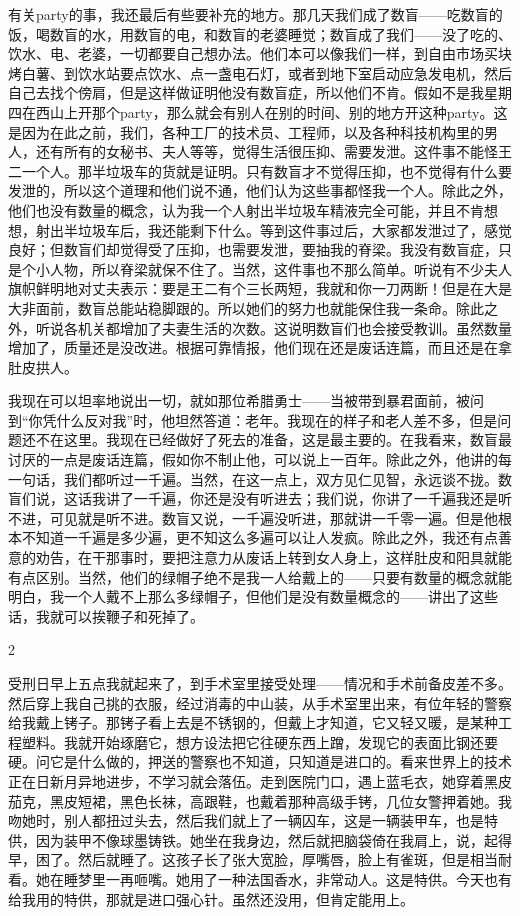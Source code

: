 有关party的事，我还最后有些要补充的地方。那几天我们成了数盲——吃数盲的饭，喝数盲的水，用数盲的电，和数盲的老婆睡觉；数盲成了我们——没了吃的、饮水、电、老婆，一切都要自己想办法。他们本可以像我们一样，到自由市场买块烤白薯、到饮水站要点饮水、点一盏电石灯，或者到地下室启动应急发电机，然后自己去找个傍肩，但是这样做证明他没有数盲症，所以他们不肯。假如不是我星期四在西山上开那个party，那么就会有别人在别的时间、别的地方开这种party。这是因为在此之前，我们，各种工厂的技术员、工程师，以及各种科技机构里的男人，还有所有的女秘书、夫人等等，觉得生活很压抑、需要发泄。这件事不能怪王二一个人。那半垃圾车的货就是证明。只有数盲才不觉得压抑，也不觉得有什么要发泄的，所以这个道理和他们说不通，他们认为这些事都怪我一个人。除此之外，他们也没有数量的概念，认为我一个人射出半垃圾车精液完全可能，并且不肯想想，射出半垃圾车后，我还能剩下什么。等到这件事过后，大家都发泄过了，感觉良好；但数盲们却觉得受了压抑，也需要发泄，要抽我的脊梁。我没有数盲症，只是个小人物，所以脊梁就保不住了。当然，这件事也不那么简单。听说有不少夫人旗帜鲜明地对丈夫表示：要是王二有个三长两短，我就和你一刀两断！但是在大是大非面前，数盲总能站稳脚跟的。所以她们的努力也就能保住我一条命。除此之外，听说各机关都增加了夫妻生活的次数。这说明数盲们也会接受教训。虽然数量增加了，质量还是没改进。根据可靠情报，他们现在还是废话连篇，而且还是在拿肚皮拱人。 

我现在可以坦率地说出一切，就如那位希腊勇士——当被带到暴君面前，被问到“你凭什么反对我”时，他坦然答道：老年。我现在的样子和老人差不多，但是问题还不在这里。我现在已经做好了死去的准备，这是最主要的。在我看来，数盲最讨厌的一点是废话连篇，假如你不制止他，可以说上一百年。除此之外，他讲的每一句话，我们都听过一千遍。当然，在这一点上，双方见仁见智，永远谈不拢。数盲们说，这话我讲了一千遍，你还是没有听进去；我们说，你讲了一千遍我还是听不进，可见就是听不进。数盲又说，一千遍没听进，那就讲一千零一遍。但是他根本不知道一千遍是多少遍，更不知这么多遍可以让人发疯。除此之外，我还有点善意的劝告，在干那事时，要把注意力从废话上转到女人身上，这样肚皮和阳具就能有点区别。当然，他们的绿帽子绝不是我一人给戴上的——只要有数量的概念就能明白，我一个人戴不上那么多绿帽子，但他们是没有数量概念的——讲出了这些话，我就可以挨鞭子和死掉了。 



2 

受刑日早上五点我就起来了，到手术室里接受处理——情况和手术前备皮差不多。然后穿上我自己挑的衣服，经过消毒的中山装，从手术室里出来，有位年轻的警察给我戴上铐子。那铐子看上去是不锈钢的，但戴上才知道，它又轻又暖，是某种工程塑料。我就开始琢磨它，想方设法把它往硬东西上蹭，发现它的表面比钢还要硬。问它是什么做的，押送的警察也不知道，只知道是进口的。看来世界上的技术正在日新月异地进步，不学习就会落伍。走到医院门口，遇上蓝毛衣，她穿着黑皮茄克，黑皮短裙，黑色长袜，高跟鞋，也戴着那种高级手铐，几位女警押着她。我吻她时，别人都扭过头去，然后我们就上了一辆囚车，这是一辆装甲车，也是特供，因为装甲不像球墨铸铁。她坐在我身边，然后就把脑袋倚在我肩上，说，起得早，困了。然后就睡了。这孩子长了张大宽脸，厚嘴唇，脸上有雀斑，但是相当耐看。她在睡梦里一再咂嘴。她用了一种法国香水，非常动人。这是特供。今天也有给我用的特供，那就是进口强心针。虽然还没用，但肯定能用上。 

